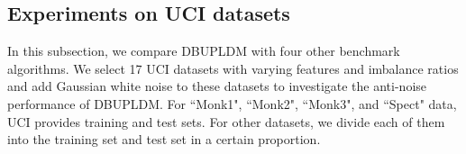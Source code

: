 \documentclass[a4paper]{cas-sc}
\begin{document}




\subsection{Experiments on UCI datasets}
\label{UCI_nor}

In this subsection, we compare DBUPLDM with four other benchmark algorithms. We select 17 UCI datasets with varying features and imbalance ratios and add Gaussian white noise to these datasets to investigate the anti-noise performance of DBUPLDM. For ``Monk1", ``Monk2", ``Monk3", and ``Spect" data, UCI provides training and test sets. For other datasets, we divide each of them into the training set and test set in a certain proportion.
\end{document}
